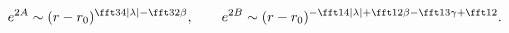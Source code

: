 \begin{equation}
e^{2A}\sim (r-r_0)^{\fft34|\lambda|-\fft32\beta},\qquad
e^{2B}\sim (r-r_0)^{-\fft14|\lambda|+\fft12\beta-\fft13\gamma+\fft12}.
\end{equation}

